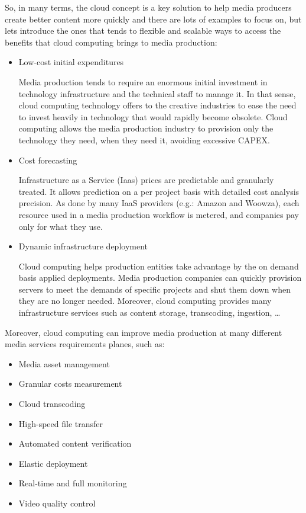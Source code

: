 So, in many terms, the cloud concept is a key solution to help media producers create better content more quickly and there are lots of examples to focus on, but lets introduce the ones that tends to flexible and scalable ways to access the benefits that cloud computing brings to media production:

\begin{itemize}
\item Low-cost initial expenditures \hfill 

Media production tends to require an enormous initial investment in technology infrastructure and the technical staff to manage it. In that sense, cloud computing technology offers to the creative industries to ease the need to invest heavily in technology that would rapidly become obsolete. Cloud computing allows the media production industry to provision only the technology they need, when they need it, avoiding excessive CAPEX.

\item Cost forecasting\hfill 

Infrastructure as a Service (Iaas) prices are predictable and granularly treated. It allows prediction on a per project basis with detailed cost analysis precision. As done by many IaaS providers (e.g.: Amazon and Woowza), each resource used in a media production workflow is metered, and companies pay only for what they use.

\item Dynamic infrastructure deployment \hfill 

Cloud computing helps production entities take advantage by the on demand basis applied deployments. Media production companies can quickly provision servers to meet the demands of specific projects and shut them down when they are no longer needed. Moreover, cloud computing provides many infrastructure services such as content storage, transcoding, ingestion, \ldots
\end{itemize}

Moreover, cloud computing can improve media production at many different media services requirements planes, such as:

\begin{itemize}
\item Media asset management
\item Granular costs measurement
\item Cloud transcoding
\item High-speed file transfer
\item Automated content verification
\item Elastic deployment
\item Real-time and full monitoring
\item Video quality control
\end{itemize}

